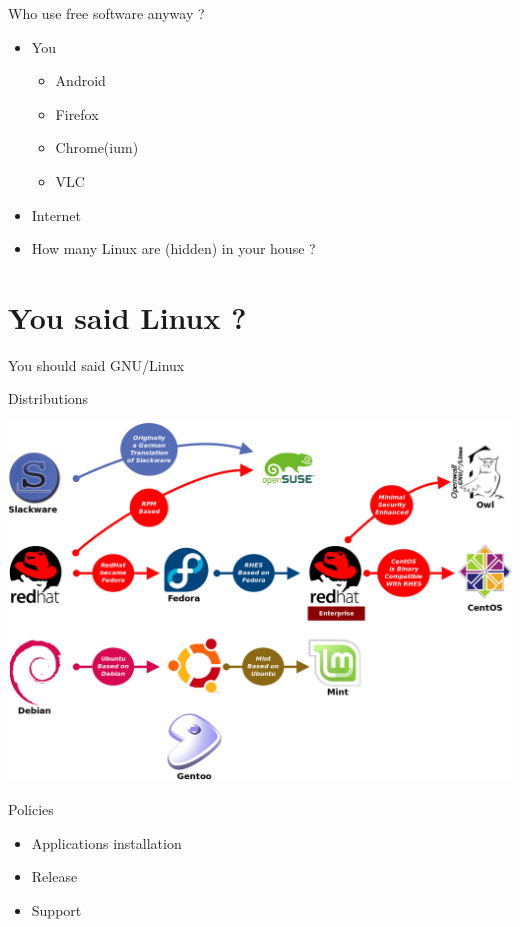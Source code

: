 \documentclass[xcolor={usenames,dvipsnames}]{beamer}
\newcommand{\sectiontitle}{}
\newcommand{\newsection}[1]{\renewcommand{\sectiontitle}{#1}\section{#1}}
\begin{document}
\begin{frame}{Who use free software anyway ?}
    \begin{itemize}
        \item<1-> You
            \begin{itemize}
                \item Android
                \item Firefox
                \item Chrome(ium)
                \item VLC
            \end{itemize}
        \item<2-> Internet
        \item<3-> How many Linux are (hidden) in your house ?
    \end{itemize}
\end{frame}

\newsection{You said Linux ?}


\begin{frame}{You should said GNU/Linux}
    \resizebox{!}{.7\textheight}{
        \begin{centering}
            
        \end{centering}
    }
\end{frame}

\begin{frame}{Distributions}
    \begin{centering}
        \includegraphics[width=.9\textwidth]{Major_distros}
    \end{centering}
\end{frame}

\begin{frame}{Policies}
    \begin{itemize}[<+->]
        \item Applications installation
        \item Release
        \item Support
    \end{itemize}
\end{frame}
\end{document}
